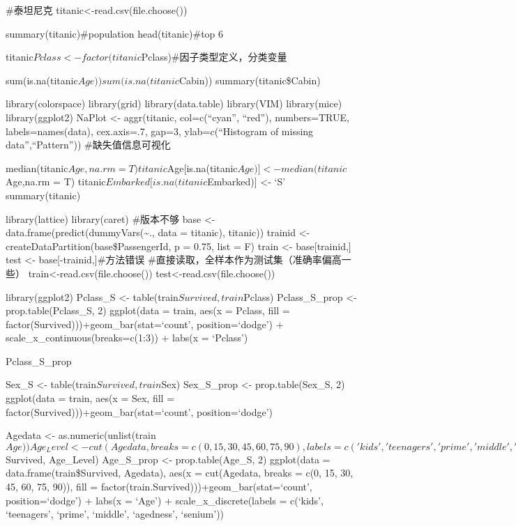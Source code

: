 \documentclass[
]{article}
\author{}
\date{\vspace{-2.5em}}
\begin{document}
\#泰坦尼克 titanic\textless-read.csv(file.choose())

summary(titanic)\#population head(titanic)\#top 6

titanic\(Pclass <- factor(titanic\)Pclass)\#因子类型定义，分类变量

sum(is.na(titanic\(Age)) sum(is.na(titanic\)Cabin))
summary(titanic\$Cabin)

library(colorspace) library(grid) library(data.table) library(VIM)
library(mice) library(ggplot2) NaPlot \textless- aggr(titanic,
col=c(``cyan'', ``red''), numbers=TRUE, labels=names(data), cex.axis=.7,
gap=3, ylab=c(``Histogram of missing data'',``Pattern''))
\#缺失值信息可视化

median(titanic\(Age,na.rm = T) titanic\)Age{[}is.na(titanic\(Age)] <- median(titanic\)Age,na.rm
= T) titanic\(Embarked[is.na(titanic\)Embarked){]} \textless- `S'
summary(titanic)

library(lattice) library(caret) \#版本不够 base \textless-
data.frame(predict(dummyVars(\textasciitilde., data = titanic),
titanic)) trainid \textless- createDataPartition(base\$PassengerId, p =
0.75, list = F) train \textless- base{[}trainid,{]} test \textless-
base{[}-trainid,{]}\#方法错误
\#直接读取，全样本作为测试集（准确率偏高一些）
train\textless-read.csv(file.choose())
test\textless-read.csv(file.choose())

library(ggplot2) Pclass\_S \textless-
table(train\(Survived, train\)Pclass) Pclass\_S\_prop \textless-
prop.table(Pclass\_S, 2) ggplot(data = train, aes(x = Pclass, fill =
factor(Survived)))+geom\_bar(stat=`count', position=`dodge') +
scale\_x\_continuous(breaks=c(1:3)) + labs(x = `Pclass')

Pclass\_S\_prop

Sex\_S \textless- table(train\(Survived, train\)Sex) Sex\_S\_prop
\textless- prop.table(Sex\_S, 2) ggplot(data = train, aes(x = Sex, fill
= factor(Survived)))+geom\_bar(stat=`count', position=`dodge')

Agedata \textless-
as.numeric(unlist(train\(Age)) Age_Level<-cut(Agedata, breaks = c(0, 15, 30, 45, 60, 75, 90), labels = c('kids', 'teenagers', 'prime', 'middle', 'agedness', 'senium' )) Age_S <- table(train\)Survived,
Age\_Level) Age\_S\_prop \textless- prop.table(Age\_S, 2) ggplot(data =
data.frame(train\$Survived, Agedata), aes(x = cut(Agedata, breaks = c(0,
15, 30, 45, 60, 75, 90)), fill =
factor(train.Survived)))+geom\_bar(stat=`count', position=`dodge') +
labs(x = `Age') + scale\_x\_discrete(labels = c(`kids', `teenagers',
`prime', `middle', `agedness', `senium'))
\end{document}
